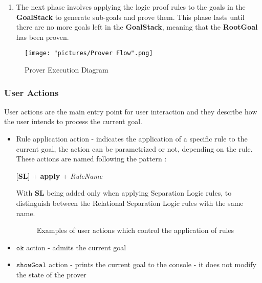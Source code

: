 \documentclass[12pt,a4paper]{article}
\begin{document}
{\begin{enumerate}
	This command will also populate the \textbf{ProvenGoals} list with axioms.
	\\
	
	Please note that the command is enclosed within parentheses, this being a requirement of Maude LOOP-MODE \cite{manual}. All the prover specific commands need to be enclosed in parenthesis. The previous command, \texttt{loop init .} was not enclosed because it is a Maude specific command, not something we want to pass as input to our prover.
	\item The next phase involves applying the logic proof rules to the goals in the \textbf{GoalStack} to generate sub-goals and prove them. This phase lasts until there are no more goals left in the \textbf{GoalStack}, meaning that the \textbf{RootGoal} has been proven.
\end{enumerate}
\begin{figure}[h]
	\texttt{[image: "pictures/Prover Flow".png]}
	\caption{Prover Execution Diagram}
	\label{fig:ProverDiagram}
\end{figure} 
\clearpage
\subsubsection{User Actions}
User actions are the main entry point for user interaction and they describe how the user intends to process the current goal.
\begin{itemize}
	\item {Rule application action - indicates the application of a specific rule to the current goal, the action can be parametrized or not, depending on the rule. These actions are named following the pattern :	
	\begin{center}
		[\textbf{SL}] + \textbf{apply} + \textit{RuleName}
	\end{center}
		With \textbf{SL} being added only when applying Separation Logic rules, to distinguish between the Relational Separation Logic rules with the same name.
	}
	\begin{figure}[h]
		\caption{Examples of user actions which control the application of rules}
		\label{fig:userActions}
	\end{figure}
	\item {\(\mathtt{ok}\) action - admits the current goal}
	\item {\(\mathtt{showGoal}\) action - prints the current goal to the console - it does not modify the state of the prover}
\end{itemize}
}
\end{document}
